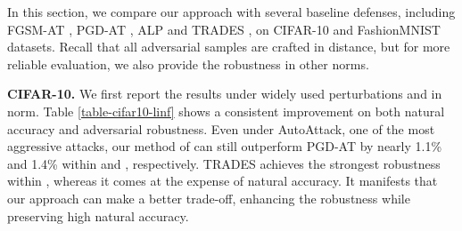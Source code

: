 \documentclass[preprint,review,12pt]{elsarticle}
\numberwithin{equation}{section}
\begin{document}
In this section, we compare our approach with several baseline defenses,
including FGSM-AT \cite{goodfellow2015}, PGD-AT \cite{madry2018}, ALP \cite{kannan2018} and TRADES \cite{zhang2019b},
on CIFAR-10 and FashionMNIST datasets.
Recall that all adversarial samples are crafted in  distance,
but for more reliable evaluation, we also provide the robustness in other norms.

\textbf{CIFAR-10.} We first report the results under widely used perturbations  and  in  norm.
Table \ref{table-cifar10-linf} shows a consistent improvement on both natural accuracy and adversarial robustness.
Even under AutoAttack, one of the most aggressive attacks,
our method of  can still outperform PGD-AT by nearly 1.1\% and 1.4\% within  and , respectively.
TRADES achieves the strongest robustness within ,
whereas it comes at the expense of natural accuracy.
It manifests that our approach can make a better trade-off, enhancing the robustness while preserving high natural accuracy.



\begin{table}[!htb]
	\center
	\caption{Comparison of classification accuracy (\%) on CIFAR-10
	under  perturbations within  or .	
	}
	\label{table-cifar10-linf}
\end{table}
\end{document}
